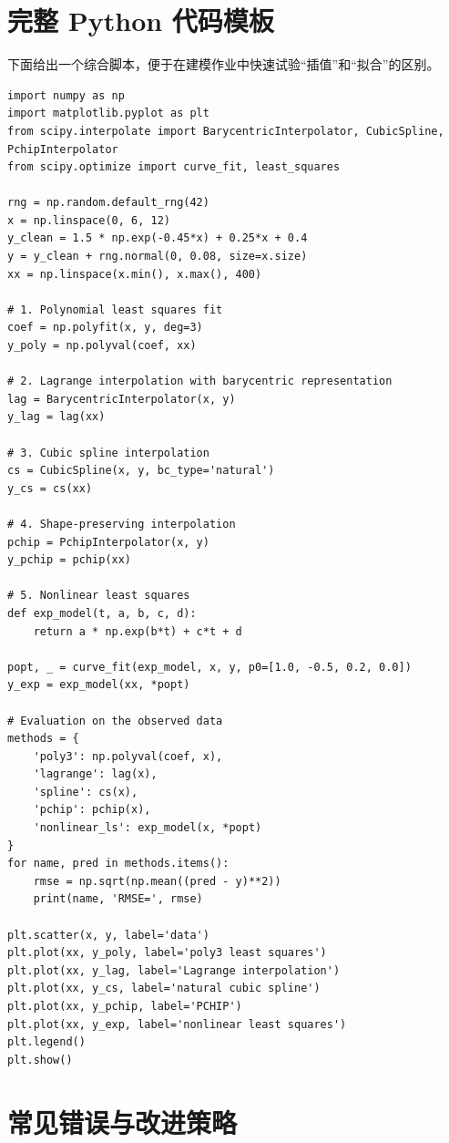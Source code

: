 \documentclass[11pt,a4paper]{ctexart}
\begin{document}
\newpage
\section{完整 Python 代码模板}

下面给出一个综合脚本，便于在建模作业中快速试验“插值”和“拟合”的区别。

\begin{lstlisting}
import numpy as np
import matplotlib.pyplot as plt
from scipy.interpolate import BarycentricInterpolator, CubicSpline, PchipInterpolator
from scipy.optimize import curve_fit, least_squares

rng = np.random.default_rng(42)
x = np.linspace(0, 6, 12)
y_clean = 1.5 * np.exp(-0.45*x) + 0.25*x + 0.4
y = y_clean + rng.normal(0, 0.08, size=x.size)
xx = np.linspace(x.min(), x.max(), 400)

# 1. Polynomial least squares fit
coef = np.polyfit(x, y, deg=3)
y_poly = np.polyval(coef, xx)

# 2. Lagrange interpolation with barycentric representation
lag = BarycentricInterpolator(x, y)
y_lag = lag(xx)

# 3. Cubic spline interpolation
cs = CubicSpline(x, y, bc_type='natural')
y_cs = cs(xx)

# 4. Shape-preserving interpolation
pchip = PchipInterpolator(x, y)
y_pchip = pchip(xx)

# 5. Nonlinear least squares
def exp_model(t, a, b, c, d):
    return a * np.exp(b*t) + c*t + d

popt, _ = curve_fit(exp_model, x, y, p0=[1.0, -0.5, 0.2, 0.0])
y_exp = exp_model(xx, *popt)

# Evaluation on the observed data
methods = {
    'poly3': np.polyval(coef, x),
    'lagrange': lag(x),
    'spline': cs(x),
    'pchip': pchip(x),
    'nonlinear_ls': exp_model(x, *popt)
}
for name, pred in methods.items():
    rmse = np.sqrt(np.mean((pred - y)**2))
    print(name, 'RMSE=', rmse)

plt.scatter(x, y, label='data')
plt.plot(xx, y_poly, label='poly3 least squares')
plt.plot(xx, y_lag, label='Lagrange interpolation')
plt.plot(xx, y_cs, label='natural cubic spline')
plt.plot(xx, y_pchip, label='PCHIP')
plt.plot(xx, y_exp, label='nonlinear least squares')
plt.legend()
plt.show()
\end{lstlisting}

\newpage
\section{常见错误与改进策略}
\end{document}
